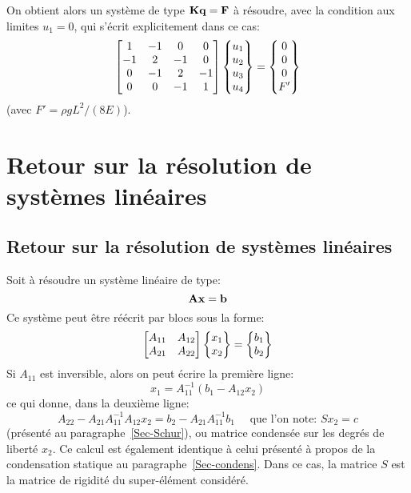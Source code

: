 %
On obtient alors un système de type $\MM{K}\VV{q}=\VV{F}$ à résoudre, avec la condition aux limites $u_1=0$, qui s'écrit explicitement dans ce cas:
\begin{equation}
\MM*{1 & -1 & 0 & 0 \\ -1 & 2 & -1 & 0 \\ 0 & -1 & 2 & -1\\ 0&0&-1&1}
\VV*{u_1\\u_2\\u_3\\u_4}
=
\VV*{0\\0\\0\\F'}
\end{equation}
(avec $F'=\rho g L^2/(8E)$).

\medskipvm
\ifVersionAvecExemplesSepares
   \section{Retour sur la résolution de systèmes linéaires}
\else
   \subsection{Retour sur la résolution de systèmes linéaires}
\fi
Soit à résoudre un système linéaire de type:
\begin{equation}\label{Eq-lin} \MM{A}\VV{x}=\VV{b} \end{equation}
Ce système peut être réécrit par blocs sous la forme:
\begin{equation} 
\MM*{A_{11} & A_{12}\\ A_{21} & A_{22}}
\VV*{x_1 \\ x_2} =
\VV*{b_1\\ b_2}
\end{equation}
\medskipvm
Si $A_{11}$ est inversible, alors on peut écrire la première ligne:
\begin{equation}
x_1 = A_{11}^{-1}\left( b_1-A_{12}x_2 \right)
\end{equation}
ce qui donne, dans la deuxième ligne:
\begin{equation}
A_{22} - A_{21}A_{11}^{-1}A_{12}x_2 = b_2 - A_{21}A_{11}^{-1}b_1
\quad \text{ que l'on note: }
S x_2=c
\end{equation}
(présenté au paragraphe~\ref{Sec-Schur}), ou matrice condensée sur les degrés de liberté $x_2$.
Ce calcul est également identique à celui présenté à propos de la condensation statique au paragraphe~\ref{Sec-condens}.
Dans ce cas, la matrice $S$ est la matrice de rigidité du super-élément considéré.

